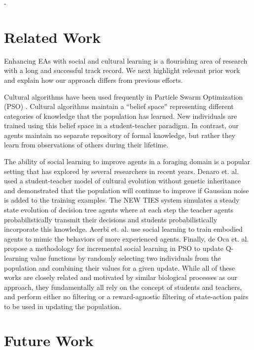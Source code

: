 \documentclass{acm_proc_article-sp}
\begin{document}
-\section{Related Work}
\label{sec:related}

Enhancing EAs with social and cultural learning is a flourishing area of research with a long and successful track record. We next highlight relevant prior work and explain how our approach differs from previous efforts.

Cultural algorithms \cite{reynolds1994introduction} have been used frequently in Particle Swarm Optimization (PSO) \cite{kennedy1995particle}. Cultural algorithms maintain a ``belief space'' representing different categories of knowledge that the population has learned. New individuals are trained using this belief space in a student-teacher paradigm. In contrast, our agents maintain no separate repository of formal knowledge, but rather they learn from observations of others during their lifetime.

The ability of social learning to improve agents in a foraging domain is a popular setting that has explored by several researchers in recent years. Denaro et. al. \cite{denaro1996cultural} used a student-teacher model of cultural evolution without genetic inheritance and demonstrated that the population will continue to improve if Gaussian noise is added to the training examples. The NEW TIES system \cite{haasdijk2008social, vogt2010modeling} simulates a steady state evolution of decision tree agents where at each step the teacher agents probabilistically transmit their decisions and students probabilistically incorporate this knowledge. Acerbi et. al. \cite{acerbi2007social} use social learning to train embodied agents to mimic the behaviors of more experienced agents. Finally, de Oca et. al. \cite{de2011incremental} propose a methodology for incremental social learning in PSO to update Q-learning \cite{watkins1992q} value functions by randomly selecting two individuals from the population and combining their values for a given update. While all of these works are closely related and motivated by similar biological processes as our approach, they fundamentally all rely on the concept of students and teachers, and perform either no filtering or a reward-agnostic filtering of state-action pairs to be used in updating the population.

\section{Future Work}
\label{sec:future}
\end{document}
